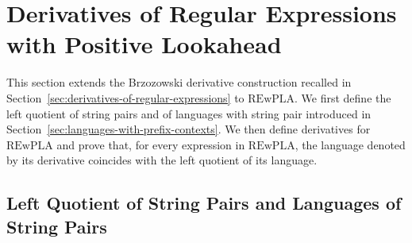 \section{Derivatives of Regular Expressions with Positive Lookahead}
\label{sec:derivatives-positive-lookahead}

This section extends the Brzozowski derivative construction recalled in Section~\ref{sec:derivatives-of-regular-expressions} to $\mathrm{REwPLA}$. We first define the left quotient of string pairs and of languages with string pair introduced in Section~\ref{sec:languages-with-prefix-contexts}. We then define derivatives for $\mathrm{REwPLA}$ and prove that, for every expression in $\mathrm{REwPLA}$, the language denoted by its derivative coincides with the left quotient of its language.




\subsection{Left Quotient of String Pairs and Languages of String Pairs}
\label{sec:stringpair-derivatives}

